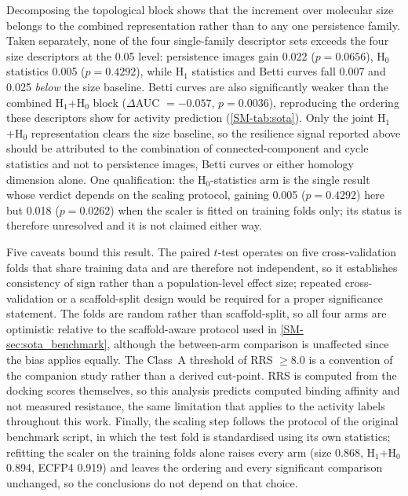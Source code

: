\documentclass[11pt,a4paper]{article}
\begin{document}
Decomposing the topological block shows that the increment over molecular size belongs to the combined representation rather than to any one persistence family. Taken separately, none of the four single-family descriptor sets exceeds the four size descriptors at the \num{0.05} level: persistence images gain \num{0.022} ($p = \num{0.0656}$), H$_0$ statistics \num{0.005} ($p = \num{0.4292}$), while H$_1$ statistics and Betti curves fall \num{0.007} and \num{0.025} \emph{below} the size baseline. Betti curves are also significantly weaker than the combined H$_1$+H$_0$ block ($\Delta$AUC $= -\num{0.057}$, $p = \num{0.0036}$), reproducing the ordering these descriptors show for activity prediction (\cref{SM-tab:sota}). Only the joint H$_1$+H$_0$ representation clears the size baseline, so the resilience signal reported above should be attributed to the combination of connected-component and cycle statistics and not to persistence images, Betti curves or either homology dimension alone. One qualification: the H$_0$-statistics arm is the single result whose verdict depends on the scaling protocol, gaining \num{0.005} ($p = \num{0.4292}$) here but \num{0.018} ($p = \num{0.0262}$) when the scaler is fitted on training folds only; its status is therefore unresolved and it is not claimed either way.

Five caveats bound this result. The paired $t$-test operates on five cross-validation folds that share training data and are therefore not independent, so it establishes consistency of sign rather than a population-level effect size; repeated cross-validation or a scaffold-split design would be required for a proper significance statement. The folds are random rather than scaffold-split, so all four arms are optimistic relative to the scaffold-aware protocol used in \cref{SM-sec:sota_benchmark}, although the between-arm comparison is unaffected since the bias applies equally. The Class~A threshold of RRS $\geq \num{8.0}$ is a convention of the companion study rather than a derived cut-point. RRS is computed from the docking scores themselves, so this analysis predicts computed binding affinity and not measured resistance, the same limitation that applies to the activity labels throughout this work. Finally, the scaling step follows the protocol of the original benchmark script, in which the test fold is standardised using its own statistics; refitting the scaler on the training folds alone raises every arm (size \num{0.868}, H$_1$+H$_0$ \num{0.894}, ECFP4 \num{0.919}) and leaves the ordering and every significant comparison unchanged, so the conclusions do not depend on that choice.
\end{document}
